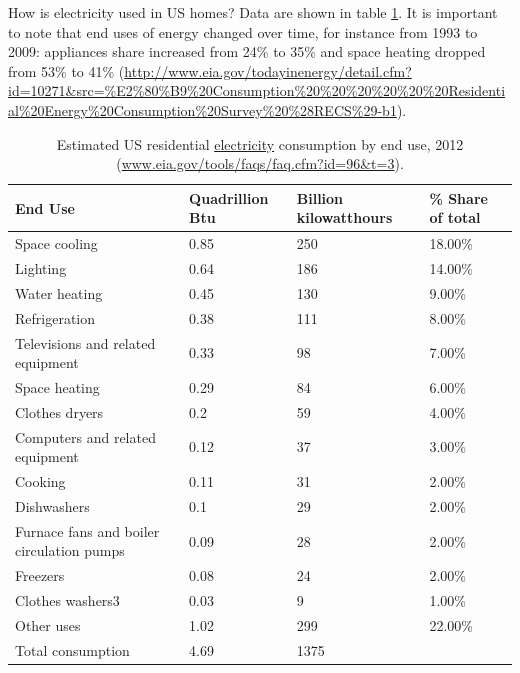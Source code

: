 \documentclass[10pt, letterpaper]{article}
\begin{document}
\begin{spacing}{1.5}
How is electricity used in US homes? %
Data are shown in table
\ref{eleEndUse}. It is important to note that end uses of energy changed over time, for instance
 from 1993 to 2009: appliances share increased from 24\% to 35\% and space
 heating dropped from 53\% to 41\%
 (\url{http://www.eia.gov/todayinenergy/detail.cfm?id=10271&src=%E2%80%B9%20Consumption%20%20%20%20%20%20Residential%20Energy%20Consumption%20Survey%20%28RECS%29-b1}). 


\begin{table}[H]\centering\footnotesize
\caption{\label{eleEndUse}  Estimated US residential \underline{electricity} consumption by end
  use, 2012 (\url{www.eia.gov/tools/faqs/faq.cfm?id=96&t=3}).}
\begin{tabular} {llll}   \hline 
End Use&Quadrillion Btu &Billion kilowatthours& \% Share of total\\\hline 
Space cooling&0.85&250&18.00\%\\
Lighting&0.64&186&14.00\%\\
Water heating&0.45&130&9.00\%\\
Refrigeration&0.38&111&8.00\%\\
Televisions and related equipment&0.33&98&7.00\%\\
Space heating&0.29&84&6.00\%\\
Clothes dryers&0.2&59&4.00\%\\
Computers and related equipment&0.12&37&3.00\%\\
Cooking&0.11&31&2.00\%\\
Dishwashers &0.1&29&2.00\%\\
Furnace fans and boiler circulation pumps&0.09&28&2.00\%\\
Freezers&0.08&24&2.00\%\\
Clothes washers3&0.03&9&1.00\%\\
Other uses&1.02&299&22.00\%\\\hline
Total consumption&4.69&1375&\\\hline
\end{tabular}\end{table}


\end{spacing}
\end{document}
